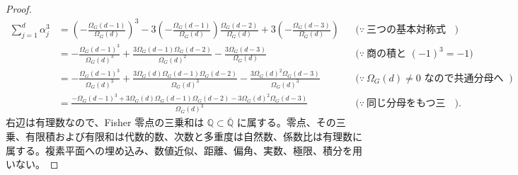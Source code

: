 \documentclass[11pt,a4paper]{article}
\theoremstyle{remark}
\begin{document}
\begin{proof}
\[\begin{aligned}
\sum_{j=1}^{d}\alpha_j^3
&=
\left(-\frac{\Omega_G(d-1)}{\Omega_G(d)}\right)^3
-3\left(-\frac{\Omega_G(d-1)}{\Omega_G(d)}\right)
\frac{\Omega_G(d-2)}{\Omega_G(d)}
+3\left(-\frac{\Omega_G(d-3)}{\Omega_G(d)}\right)
&&\bigl(\because\ \text{三つの基本対称式を代入する}\bigr)\\
&=
-\frac{\Omega_G(d-1)^3}{\Omega_G(d)^3}
+\frac{3\Omega_G(d-1)\Omega_G(d-2)}{\Omega_G(d)^2}
-\frac{3\Omega_G(d-3)}{\Omega_G(d)}
&&\bigl(\because\ \text{商の積と }(-1)^3=-1\bigr)\\
&=
-\frac{\Omega_G(d-1)^3}{\Omega_G(d)^3}
+\frac{3\Omega_G(d)\Omega_G(d-1)\Omega_G(d-2)}{\Omega_G(d)^3}
-\frac{3\Omega_G(d)^2\Omega_G(d-3)}{\Omega_G(d)^3}
&&\bigl(\because\ \Omega_G(d)\ne0\text{ なので共通分母へ移す}\bigr)\\
&=
\frac{
  -\Omega_G(d-1)^3
  +3\Omega_G(d)\Omega_G(d-1)\Omega_G(d-2)
  -3\Omega_G(d)^2\Omega_G(d-3)
}{
  \Omega_G(d)^3
}
&&\bigl(\because\ \text{同じ分母をもつ三つの分数を加える}\bigr).
\end{aligned}\]
右辺は有理数なので、Fisher 零点の三乗和は
$\mathbb Q\subset\overline{\mathbb Q}$
 に属する。零点、その三乗、有限積および有限和は代数的数、次数と多重度は自然数、係数比は有理数に属する。複素平面への埋め込み、数値近似、距離、偏角、実数、極限、積分を用いない。

\end{proof}
\end{document}
